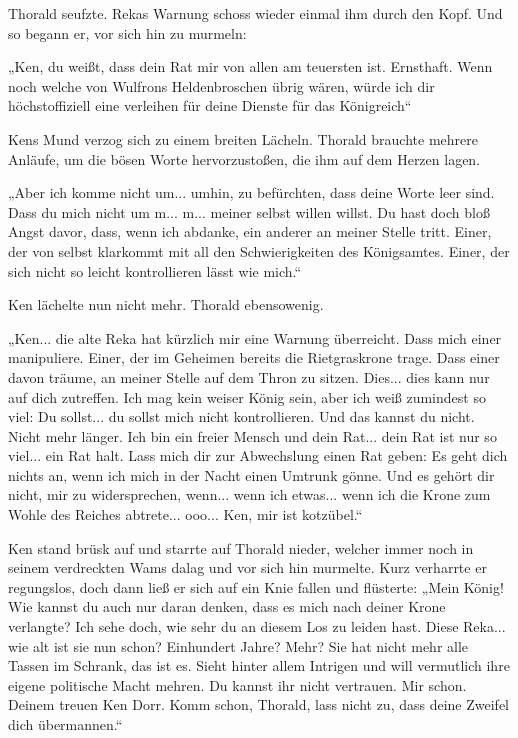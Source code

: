 \documentclass[10pt, a4paper, oneside]{book}
\begin{document}
Thorald seufzte. Rekas Warnung schoss wieder einmal ihm durch den Kopf. Und so begann er, vor sich hin zu murmeln:

„Ken, du weißt, dass dein Rat mir von allen am teuersten ist. Ernsthaft. Wenn noch welche von Wulfrons Heldenbroschen übrig wären, würde ich dir höchstoffiziell eine verleihen für deine Dienste für das Königreich“

Kens Mund verzog sich zu einem breiten Lächeln. Thorald brauchte mehrere Anläufe, um die bösen Worte hervorzustoßen, die ihm auf dem Herzen lagen.

„Aber ich komme nicht um... umhin, zu befürchten, dass deine Worte leer sind. Dass du mich nicht um m... m... meiner selbst willen willst. Du hast doch bloß Angst davor, dass, wenn ich abdanke, ein anderer an meiner Stelle tritt. Einer, der von selbst klarkommt mit all den Schwierigkeiten des Königsamtes. Einer, der sich nicht so leicht kontrollieren lässt wie mich.“

Ken lächelte nun nicht mehr. Thorald ebensowenig.

„Ken... die alte Reka hat kürzlich mir eine Warnung überreicht. Dass mich einer manipuliere. Einer, der im Geheimen bereits die Rietgraskrone trage. Dass einer davon träume, an meiner Stelle auf dem Thron zu sitzen. Dies... dies kann nur auf dich zutreffen. Ich mag kein weiser König sein, aber ich weiß zumindest so viel: Du sollst... du sollst mich nicht kontrollieren. Und das kannst du nicht. Nicht mehr länger. Ich bin ein freier Mensch und dein Rat... dein Rat ist nur so viel... ein Rat halt. Lass mich dir zur Abwechslung einen Rat geben: Es geht dich nichts an, wenn ich mich in der Nacht einen Umtrunk gönne. Und es gehört dir nicht, mir zu widersprechen, wenn... wenn ich etwas... wenn ich die Krone zum Wohle des Reiches abtrete... ooo... Ken, mir ist kotzübel.“

Ken stand brüsk auf und starrte auf Thorald nieder, welcher immer noch in seinem verdreckten Wams dalag und vor sich hin murmelte. Kurz verharrte er regungslos, doch dann ließ er sich auf ein Knie fallen und flüsterte: „Mein König! Wie kannst du auch nur daran denken, dass es mich nach deiner Krone verlangte? Ich sehe doch, wie sehr du an diesem Los zu leiden hast. Diese Reka... wie alt ist sie nun schon? Einhundert Jahre? Mehr? Sie hat nicht mehr alle Tassen im Schrank, das ist es. Sieht hinter allem Intrigen und will vermutlich ihre eigene politische Macht mehren. Du kannst ihr nicht vertrauen. Mir schon. Deinem treuen Ken Dorr. Komm schon, Thorald, lass nicht zu, dass deine Zweifel dich übermannen.“
\end{document}
